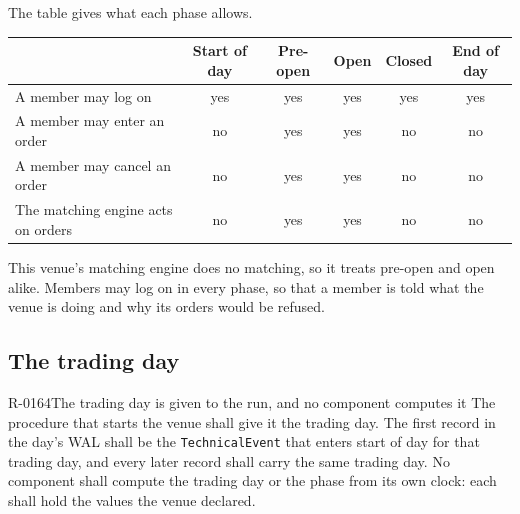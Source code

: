 The table gives what each phase allows.

\begin{center}
\small
\begin{tabular}{lccccc}
  & Start of day & Pre-open & Open & Closed & End of day \\
  \hline
  A member may log on                & yes & yes & yes & yes & yes \\
  A member may enter an order        & no  & yes & yes & no  & no  \\
  A member may cancel an order       & no  & yes & yes & no  & no  \\
  The matching engine acts on orders & no  & yes & yes & no  & no  \\
\end{tabular}
\end{center}

This venue's matching engine does no matching, so it treats pre-open and open alike. Members may
log on in every phase, so that a member is told what the venue is doing and why its orders would be
refused.

\subsection{The trading day}
\label{sec:ha:technical_event:trading_day}

\begin{requirement}{R-0164}{The trading day is given to the run, and no component computes it}
  The procedure that starts the venue shall give it the trading day. The first record in the
  day's WAL shall be the \texttt{TechnicalEvent} that enters start of day for that trading day,
  and every later record shall carry the same trading day. No component shall compute the
  trading day or the phase from its own clock: each shall hold the values the venue declared.
\end{requirement}

